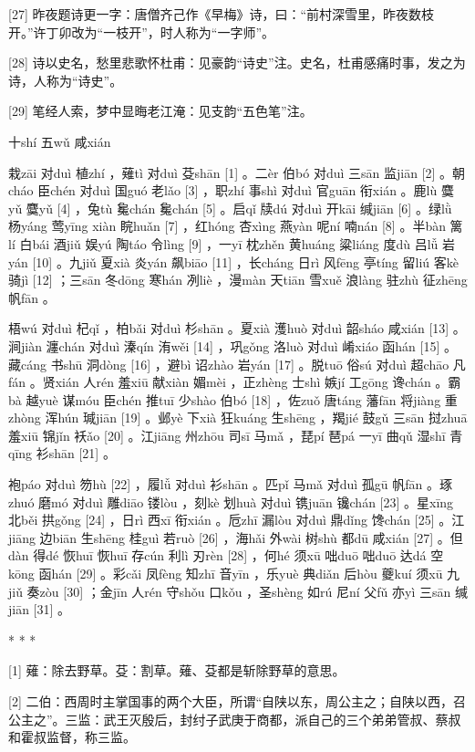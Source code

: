 \documentclass[12pt,UTF8]{ctexbook}
\begin{document}
[27] 昨夜题诗更一字：唐僧齐己作《早梅》诗，曰：“前村深雪里，昨夜数枝开。”许丁卯改为“一枝开”，时人称为“一字师”。

[28] 诗以史名，愁里悲歌怀杜甫：见豪韵“诗史”注。史名，杜甫感痛时事，发之为诗，人称为“诗史”。

[29] 笔经人索，梦中显晦老江淹：见支韵“五色笔”注。





十shí 五wǔ 咸xián


栽zāi 对duì 植zhí ，薙tì 对duì 芟shān [1] 。二èr 伯bó 对duì 三sān 监jiān [2] 。朝cháo 臣chén 对duì 国guó 老lǎo [3] ，职zhí 事shì 对duì 官guān 衔xián 。鹿lù 麌yǔ 麌yǔ [4] ，兔tù 毚chán 毚chán [5] 。启qǐ 牍dú 对duì 开kāi 缄jiān [6] 。绿lǜ 杨yáng 莺yīng xiàn 睆huǎn [7] ，红hóng 杏xìng 燕yàn 呢ní 喃nán [8] 。半bàn 篱lí 白bái 酒jiǔ 娱yú 陶táo 令lìng [9] ，一yī 枕zhěn 黄huáng 粱liáng 度dù 吕lǚ 岩yán [10] 。九jiǔ 夏xià 炎yán 飙biāo [11] ，长cháng 日rì 风fēng 亭tíng 留liú 客kè 骑jì [12] ；三sān 冬dōng 寒hán 冽liè ，漫màn 天tiān 雪xuě 浪làng 驻zhù 征zhēng 帆fān 。

梧wú 对duì 杞qǐ ，柏bǎi 对duì 杉shān 。夏xià 濩huò 对duì 韶sháo 咸xián [13] 。涧jiàn 瀍chán 对duì 溱qín 洧wěi [14] ，巩gǒng 洛luò 对duì 崤xiáo 函hán [15] 。藏cáng 书shū 洞dòng [16] ，避bì 诏zhào 岩yán [17] 。脱tuō 俗sú 对duì 超chāo 凡fán 。贤xián 人rén 羞xiū 献xiàn 媚mèi ，正zhèng 士shì 嫉jí 工gōng 谗chán 。霸bà 越yuè 谋móu 臣chén 推tuī 少shào 伯bó [18] ，佐zuǒ 唐táng 藩fān 将jiàng 重zhòng 浑hún 瑊jiān [19] 。邺yè 下xià 狂kuáng 生shēng ，羯jié 鼓gǔ 三sān 挝zhuā 羞xiū 锦jǐn 袄ǎo [20] 。江jiāng 州zhōu 司sī 马mǎ ，琵pí 琶pá 一yī 曲qǔ 湿shī 青qīng 衫shān [21] 。

袍páo 对duì 笏hù [22] ，履lǚ 对duì 衫shān 。匹pǐ 马mǎ 对duì 孤gū 帆fān 。琢zhuó 磨mó 对duì 雕diāo 镂lòu ，刻kè 划huà 对duì 镌juān 镵chán [23] 。星xīng 北běi 拱gǒng [24] ，日rì 西xī 衔xián 。卮zhī 漏lòu 对duì 鼎dǐng 馋chán [25] 。江jiāng 边biān 生shēng 桂guì 若ruò [26] ，海hǎi 外wài 树shù 都dū 咸xián [27] 。但dàn 得dé 恢huī 恢huī 存cún 利lì 刃rèn [28] ，何hé 须xū 咄duō 咄duō 达dá 空kōng 函hán [29] 。彩cǎi 凤fèng 知zhī 音yīn ，乐yuè 典diǎn 后hòu 夔kuí 须xū 九jiǔ 奏zòu [30] ；金jīn 人rén 守shǒu 口kǒu ，圣shèng 如rú 尼ní 父fǔ 亦yì 三sān 缄jiān [31] 。



* * *



[1] 薙：除去野草。芟：割草。薙、芟都是斩除野草的意思。

[2] 二伯：西周时主掌国事的两个大臣，所谓“自陕以东，周公主之；自陕以西，召公主之”。三监：武王灭殷后，封纣子武庚于商都，派自己的三个弟弟管叔、蔡叔和霍叔监督，称三监。
\end{document}
